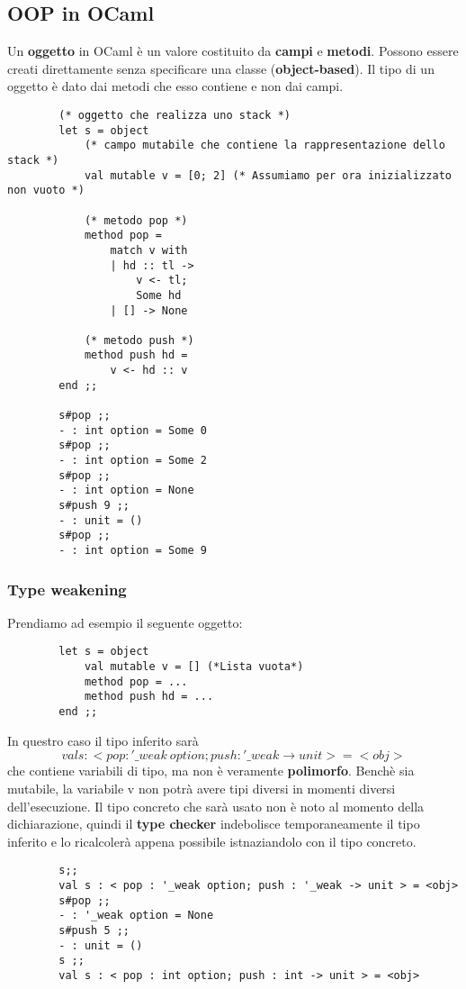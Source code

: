\subsection{OOP in OCaml}
Un \textbf{oggetto} in OCaml è un valore costituito da \textbf{campi} e \textbf{metodi}. Possono essere creati direttamente senza specificare una classe (\textbf{object-based}). Il tipo di un oggetto è dato dai metodi che esso contiene e non dai campi.
\begin{example}
	\begin{lstlisting}
		(* oggetto che realizza uno stack *)
		let s = object
			(* campo mutabile che contiene la rappresentazione dello stack *)
			val mutable v = [0; 2] (* Assumiamo per ora inizializzato non vuoto *)
			
			(* metodo pop *)
			method pop =
				match v with
				| hd :: tl ->
					v <- tl;
					Some hd
				| [] -> None
			
			(* metodo push *)
			method push hd =
				v <- hd :: v
		end ;;
		
		s#pop ;;
		- : int option = Some 0
		s#pop ;;
		- : int option = Some 2
		s#pop ;;
		- : int option = None
		s#push 9 ;;
		- : unit = ()
		s#pop ;;
		- : int option = Some 9
	\end{lstlisting}
\end{example}

\subsubsection{Type weakening}
Prendiamo ad esempio il seguente oggetto:
\begin{example}
	\begin{lstlisting}
		let s = object
			val mutable v = [] (*Lista vuota*)
			method pop = ...
			method push hd = ...
		end ;;
	\end{lstlisting}
\end{example}
In questro caso il tipo inferito sarà
\begin{equation*}
	val s : < pop : '\_weak \: option; push : '\_weak \rightarrow unit > = <obj>
\end{equation*}
che contiene variabili di tipo, ma non è veramente \textbf{polimorfo}. Benchè sia mutabile, la variabile v non potrà avere tipi diversi in momenti diversi dell'esecuzione. Il tipo concreto che sarà usato non è noto al momento della dichiarazione, quindi il \textbf{type checker} indebolisce temporaneamente il tipo inferito e lo ricalcolerà appena possibile istnaziandolo con il tipo concreto.
\begin{example}
	\begin{lstlisting}
		s;;
		val s : < pop : '_weak option; push : '_weak -> unit > = <obj>
		s#pop ;;
		- : '_weak option = None
		s#push 5 ;;
		- : unit = ()
		s ;;
		val s : < pop : int option; push : int -> unit > = <obj>
	\end{lstlisting}
\end{example}

